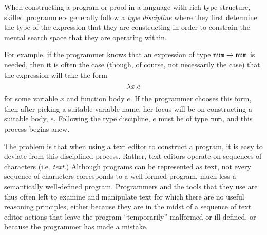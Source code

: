



When constructing a program or proof in a language with rich type
structure, skilled programmers generally follow a \emph{type discipline}
where they first determine the type of the expression that they are
constructing in order to constrain the mental search space that they are
operating within.

For example, if the programmer knows that an expression of type
$\texttt{num} \rightarrow \texttt{num}$ is needed, then it is often the case (though, of course, not
necessarily the case) that the expression will take the form $$\lambda \mathit{x}.e$$
for some variable $x$ and function body $e$. If the programmer chooses this
form, then after picking a suitable variable name, her focus will be on
constructing a suitable body, $e$. Following the type discipline, $e$ must
be of type $\texttt{num}$, and this process begins anew.

The problem is that when using a text
editor to construct a program, it is easy to deviate from this disciplined process.  Rather, text editors operate on sequences of
characters (i.e. \emph{text}.) Although programs can be represented as text, not
every sequence of characters corresponds to a well-formed program, much
less a semantically well-defined program. Programmers and the tools that they use are thus 
often left to examine and manipulate text for which there are no useful
reasoning principles, either because they are in the midst of a sequence of
text editor actions that leave the program ``temporarily'' malformed or ill-defined, or because the programmer has made a mistake.

